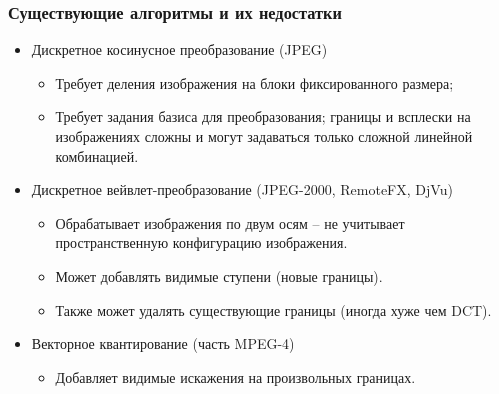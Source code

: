 \documentclass{beamer}
\begin{document}
\begin{frame}
\frametitle{Существующие алгоритмы и их недостатки}

\begin{itemize}
\item Дискретное косинусное преобразование (JPEG)
  \begin{itemize}
  \item Требует деления изображения на блоки фиксированного размера;
  \item Требует задания базиса для преобразования; границы и всплески на
    изображениях сложны и могут задаваться только сложной линейной комбинацией.
  \end{itemize}
\item Дискретное вейвлет-преобразование (JPEG-2000, RemoteFX, DjVu)
  \begin{itemize}
  \item Обрабатывает изображения по двум осям -- не учитывает пространственную
    конфигурацию изображения.
  \item Может добавлять видимые ступени (новые границы).
  \item Также может удалять существующие границы (иногда хуже чем DCT).
  \end{itemize}
\item Векторное квантирование (часть MPEG-4)
  \begin{itemize}
  \item Добавляет видимые искажения на произвольных границах.
  \end{itemize}
\end{itemize}

\end{frame}
\end{document}
